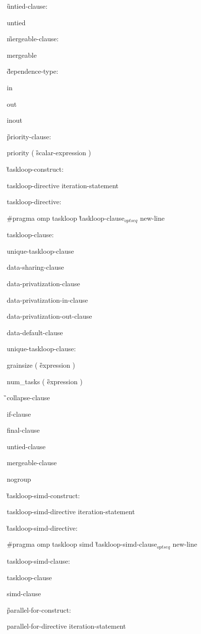 {\G untied-clause:

\C\I untied

\G mergeable-clause:

\C\I mergeable

\G dependence-type:

\C\I in

\I out

\I inout

\G priority-clause:

\C\I priority ( \G scalar-expression \C )

\G taskloop-construct:

\I taskloop-directive iteration-statement

taskloop-directive:

\C\I \#pragma omp taskloop \G taskloop-clause$_{optseq}$ new-line

taskloop-clause:

\I unique-taskloop-clause 

\I data-sharing-clause

\I data-privatization-clause

\I data-privatization-in-clause

\I data-privatization-out-clause

\I data-default-clause

unique-taskloop-clause:

\C\I grainsize ( \G expression \C )

\I num\_tasks ( \G expression \C )

\G\I collapse-clause

\I if-clause

\I final-clause

\I untied-clause

\I mergeable-clause

\C\I nogroup

\G taskloop-simd-construct:

\I taskloop-simd-directive iteration-statement

\G taskloop-simd-directive:

\C\I \#pragma omp taskloop simd \G taskloop-simd-clause$_{optseq}$ new-line

taskloop-simd-clause:

\I taskloop-clause

\I simd-clause

\G parallel-for-construct:

\I parallel-for-directive iteration-statement

}
